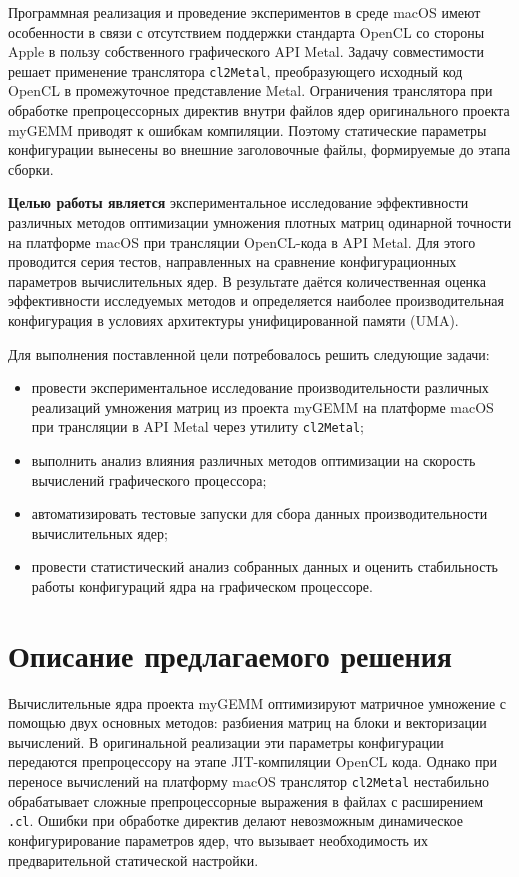 \documentclass[a4paper]{article}
\begin{document}
Программная реализация и проведение экспериментов в среде macOS имеют особенности в связи с отсутствием поддержки стандарта OpenCL со стороны Apple в пользу собственного графического API Metal. Задачу совместимости решает применение транслятора \texttt{cl2Metal}, преобразующего исходный код OpenCL в промежуточное представление Metal. Ограничения транслятора при обработке препроцессорных директив внутри файлов ядер оригинального проекта myGEMM приводят к ошибкам компиляции. Поэтому статические параметры конфигурации вынесены во внешние заголовочные файлы, формируемые до этапа сборки.

\textbf{Целью работы является} экспериментальное исследование эффективности различных методов оптимизации умножения плотных матриц одинарной точности на платформе macOS при трансляции OpenCL-кода в API Metal. Для этого проводится серия тестов, направленных на сравнение конфигурационных параметров вычислительных ядер. В результате даётся количественная оценка эффективности исследуемых методов и определяется наиболее производительная конфигурация в условиях архитектуры унифицированной памяти (UMA).

Для выполнения поставленной цели потребовалось решить следующие задачи:
\begin{itemize}
    \item провести экспериментальное исследование производительности различных реализаций умножения матриц из проекта myGEMM на платформе macOS при трансляции в API Metal через утилиту \texttt{cl2Metal};
    \item выполнить анализ влияния различных методов оптимизации на скорость вычислений графического процессора;
    \item автоматизировать тестовые запуски для сбора данных производительности вычислительных ядер;
    \item провести статистический анализ собранных данных и оценить стабильность работы конфигураций ядра на графическом процессоре.
\end{itemize}

\section{Описание предлагаемого решения}

Вычислительные ядра проекта myGEMM оптимизируют матричное умножение с помощью двух основных методов: разбиения матриц на блоки и векторизации вычислений. В оригинальной реализации эти параметры конфигурации передаются препроцессору на этапе JIT-компиляции OpenCL кода. Однако при переносе вычислений на платформу macOS транслятор \texttt{cl2Metal} нестабильно обрабатывает сложные препроцессорные выражения в файлах с расширением \texttt{.cl}. Ошибки при обработке директив делают невозможным динамическое конфигурирование параметров ядер, что вызывает необходимость их предварительной статической настройки.
\end{document}
